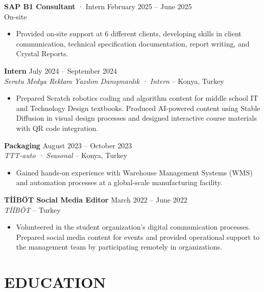 \documentclass[a4paper,8pt]{article}
\begin{document}
\vspace{3pt}
{\small \textbf{SAP B1 Consultant} · Intern \hfill February 2025 -- June 2025}\\
{\small On-site}
\begin{itemize}
\item {\small Provided on-site support at 6 different clients, developing skills in client communication, technical specification documentation, report writing, and Crystal Reports.}
\end{itemize}

\vspace{3pt}

\textbf{Intern} \hfill {\small July 2024 -- September 2024}\\
{\small \textit{Seratu Medya Reklam Yazılım Danışmanlık · Intern} -- Konya, Turkey}
\begin{itemize}
\item {\small Prepared Scratch robotics coding and algorithm content for middle school IT and Technology Design textbooks. Produced AI-powered content using Stable Diffusion in visual design processes and designed interactive course materials with QR code integration.}
\end{itemize}

\vspace{3pt}

\textbf{Packaging} \hfill {\small August 2023 -- October 2023}\\
{\small \textit{TTT-auto · Seasonal} -- Konya, Turkey}
\begin{itemize}
\item {\small Gained hands-on experience with Warehouse Management Systems (WMS) and automation processes at a global-scale manufacturing facility.}
\end{itemize}

\vspace{3pt}

\textbf{TİİBÖT Social Media Editor} \hfill {\small March 2022 -- June 2022}\\
{\small \textit{TİİBÖT} -- Turkey}
\begin{itemize}
\item {\small Volunteered in the student organization's digital communication processes. Prepared social media content for events and provided operational support to the management team by participating remotely in organizations.}
\end{itemize}

\section{EDUCATION}
\end{document}
